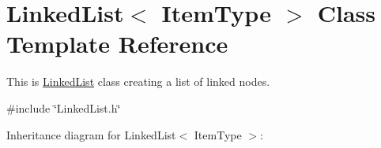 \hypertarget{classLinkedList}{}\section{Linked\+List$<$ Item\+Type $>$ Class Template Reference}
\label{classLinkedList}


This is \hyperlink{classLinkedList}{Linked\+List} class creating a list of linked nodes.  




{\ttfamily \#include \char`\"{}Linked\+List.\+h\char`\"{}}



Inheritance diagram for Linked\+List$<$ Item\+Type $>$\+:
